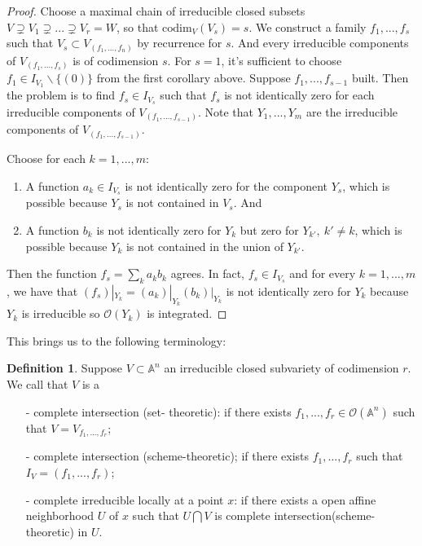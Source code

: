 \documentclass[12pt,a4paper,english]{article}
\theoremstyle{plain}
\theoremstyle{definition}
\newtheorem{defi}{Definition}
\theoremstyle{remark}
\newcommand{\codim}{\mathrm{codim}}
\begin{document}
\begin{proof}
Choose a maximal chain of irreducible closed subsets $V\supsetneq V_{1}\supsetneq...\supsetneq V_{r}=W$, so that $\codim_{V}(V_{s})=s$. We construct a family $f_{1},...,f_{s}$ such that $V_{s}\subset V_{(f_{1},...,f_{n})}$ by recurrence for $s$. And every irreducible components of $V_{(f_{1},...,f_{s})}$ is of codimension $s$. For $s=1$, it's sufficient to choose $f_{1}\in I_{V_{1}}\backslash \{(0)\}$ from the first corollary above. Suppose $f_{1},...,f_{s-1}$ built. Then the problem is to find $f_{s}\in I_{V_{s}}$ such that $f_{s}$ is not identically zero for each irreducible components of $V_{(f_{1},...,f_{s-1})}$. Note that $Y_{1},...,Y_{m}$ are the irreducible components of $V_{(f_{1},...,f_{s-1})}$.

Choose for each $k=1,...,m$:
\begin{enumerate}
    \item A function $a_{k}\in I_{V_{s}}$ is not identically zero for the component $Y_{s}$, which is possible because $Y_{s}$ is not contained in $V_{s}$. And
    \item A function $b_{k}$ is not identically zero for $Y_{k}$ but zero for $Y_{k'},\ k'\not=k$, which is possible because $Y_{k}$ is not contained in the union of $Y_{k'}$.
\end{enumerate}
Then the function $f_{s}=\sum_{k}a_{k}b_{k}$ agrees. In fact, $f_{s}\in I_{V_{s}}$ and for every $k=1,...,m$, we have that $(f_{s})|_{Y_{k}}=(a_{k})|_{Y_{k}}(b_{k})|_{Y_{k}}$ is not identically zero for $Y_{k}$ because $Y_{k}$ is irreducible so $\mathcal{O}(Y_{k})$ is integrated.
\end{proof}
This brings us to the following terminology:
\begin{defi}
Suppose $V\subset\mathbb{A}^{n}$ an irreducible closed subvariety of codimension $r$. We call that $V$ is a
\begin{enumerate}
    \item[-] complete intersection (set- theoretic): if there exists $f_{1},...,f_{r}\in\mathcal{O}(\mathbb{A}^{n})$ such that $V=V_{f_{1},...,f_{r}}$;
    \item[-] complete intersection (scheme-theoretic); if there exists $f_{1},...,f_{r} $ such that $I_{V}=(f_{1},...,f_{r})$;
    \item[-] complete irreducible locally at a point $x$: if there exists a open affine neighborhood $U$ of $x$ such that $U\bigcap V$ is complete intersection(scheme-theoretic) in $U$.
\end{enumerate}
\end{defi}
\end{document}
